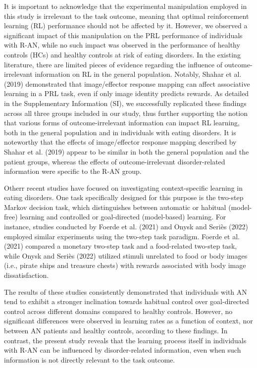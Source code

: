 \documentclass[
  man,floatsintext]{apa6}
\begin{document}
It is important to acknowledge that the experimental manipulation employed in this study is irrelevant to the task outcome, meaning that optimal reinforcement learning (RL) performance should not be affected by it. However, we observed a significant impact of this manipulation on the PRL performance of individuals with R-AN, while no such impact was observed in the performance of healthy controls (HCs) and healthy controls at risk of eating disorders. In the existing literature, there are limited pieces of evidence regarding the influence of outcome-irrelevant information on RL in the general population. Notably, Shahar et al. (2019) demonstrated that image/effector response mapping can affect associative learning in a PRL task, even if only image identity predicts rewards. As detailed in the Supplementary Information (SI), we successfully replicated these findings across all three groups included in our study, thus further supporting the notion that various forms of outcome-irrelevant information can impact RL learning, both in the general population and in individuals with eating disorders. It is noteworthy that the effects of image/effector response mapping described by Shahar et al. (2019) appear to be similar in both the general population and the patient groups, whereas the effects of outcome-irrelevant disorder-related information were specific to the R-AN group.

Otherr recent studies have focused on investigating context-specific learning in eating disorders. One task specifically designed for this purpose is the two-step Markov decision task, which distinguishes between automatic or habitual (model-free) learning and controlled or goal-directed (model-based) learning. For instance, studies conducted by Foerde et al. (2021) and Onysk and Seriès (2022) employed similar experiments using the two-step task paradigm. Foerde et al. (2021) compared a monetary two-step task and a food-related two-step task, while Onysk and Seriès (2022) utilized stimuli unrelated to food or body images (i.e., pirate ships and treasure chests) with rewards associated with body image dissatisfaction.

The results of these studies consistently demonstrated that individuals with AN tend to exhibit a stronger inclination towards habitual control over goal-directed control across different domains compared to healthy controls. However, no significant differences were observed in learning rates as a function of context, nor between AN patients and healthy controls, according to these findings. In contrast, the present study reveals that the learning process itself in individuals with R-AN can be influenced by disorder-related information, even when such information is not directly relevant to the task outcome.
\end{document}
